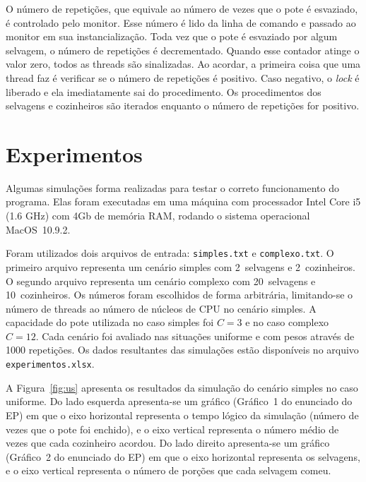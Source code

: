 \documentclass[11pt,a4paper]{article}
\begin{document}
O número de repetições, que equivale ao número de vezes que o pote é esvaziado, é controlado
pelo monitor. Esse número é lido da linha de comando e passado ao monitor em sua instancialização.
Toda vez que o pote é esvaziado por algum selvagem, o número de repetições é decrementado. Quando
esse contador atinge o valor zero, todos as threads são sinalizadas. Ao acordar, a primeira coisa
que uma thread faz é verificar se o número de repetições é positivo. Caso negativo, o {\it lock} é
liberado e ela imediatamente sai do procedimento. Os procedimentos dos selvagens e cozinheiros são
iterados enquanto o número de repetições for positivo.


\section{Experimentos}
\label{sec:exp}

Algumas simulações forma realizadas para testar o correto funcionamento do programa. Elas foram 
executadas em uma máquina com processador Intel Core i5 (1.6 GHz) com 4Gb de memória RAM, rodando o 
sistema operacional MacOS~10.9.2.

Foram utilizados dois arquivos de entrada: \verb|simples.txt| e \verb|complexo.txt|. O primeiro 
arquivo representa um cenário simples com 2~selvagens e 2~cozinheiros. O segundo arquivo representa 
um cenário complexo com 20~selvagens e 10~cozinheiros. Os números foram escolhidos de forma 
arbitrária, limitando-se o número de threads ao número de núcleos de CPU no cenário simples. A 
capacidade do pote utilizada no caso simples foi $C = 3$ e no caso complexo $C = 12$. Cada cenário 
foi avaliado nas situações uniforme e com pesos através de 1000 repetições. Os dados resultantes das 
simulações estão disponíveis no arquivo \verb|experimentos.xlsx|.

A Figura~\ref{fig:us} apresenta os resultados da simulação do cenário simples no caso uniforme. Do
lado esquerda apresenta-se um gráfico (Gráfico~1 do enunciado do EP) em que o eixo horizontal
representa o tempo lógico da simulação (número de vezes que o pote foi enchido), e o eixo vertical
representa o  número médio de vezes que cada cozinheiro acordou. Do lado direito apresenta-se um
gráfico (Gráfico~2 do enunciado do EP) em que o eixo horizontal representa os selvagens, e o eixo
vertical representa o número de porções que cada selvagem comeu.
\end{document}
